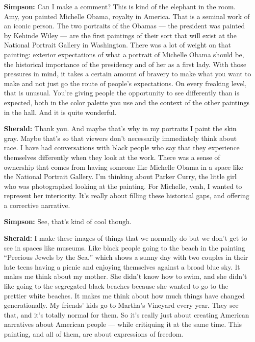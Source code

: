 \textbf{Simpson:} Can I make a comment? This is kind of the elephant in
the room. Amy, you painted Michelle Obama, royalty in America. That is a
seminal work of an iconic person. The two portraits of the Obamas ---
the president was painted by Kehinde Wiley --- are the first paintings
of their sort that will exist at the National Portrait Gallery in
Washington. There was a lot of weight on that painting: exterior
expectations of what a portrait of Michelle Obama should be, the
historical importance of the presidency and of her as a first lady. With
those pressures in mind, it takes a certain amount of bravery to make
what you want to make and not just go the route of people's
expectations. On every freaking level, that is unusual. You're giving
people the opportunity to see differently than is expected, both in the
color palette you use and the context of the other paintings in the
hall. And it is quite wonderful.

\textbf{Sherald:} Thank you. And maybe that's why in my portraits I
paint the skin gray. Maybe that's so that viewers don't necessarily
immediately think about race. I have had conversations with black people
who say that they experience themselves differently when they look at
the work. There was a sense of ownership that comes from having someone
like Michelle Obama in a space like the National Portrait Gallery. I'm
thinking about Parker Curry, the little girl who was photographed
looking at the painting. For Michelle, yeah, I wanted to represent her
interiority. It's really about filling these historical gaps, and
offering a corrective narrative.

\textbf{Simpson:} See, that's kind of cool though.

\textbf{Sherald:} I make these images of things that we normally do but
we don't get to see in spaces like museums. Like black people going to
the beach in the painting ``Precious Jewels by the Sea,'' which shows a
sunny day with two couples in their late teens having a picnic and
enjoying themselves against a broad blue sky. It makes me think about my
mother. She didn't know how to swim, and she didn't like going to the
segregated black beaches because she wanted to go to the prettier white
beaches. It makes me think about how much things have changed
generationally. My friends' kids go to Martha's Vineyard every year.
They see that, and it's totally normal for them. So it's really just
about creating American narratives about American people --- while
critiquing it at the same time. This painting, and all of them, are
about expressions of freedom.

